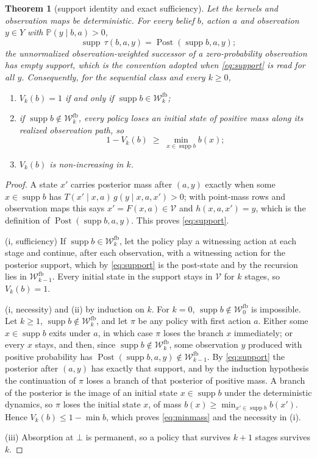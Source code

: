 \documentclass[11pt,a4paper]{article}
\theoremstyle{plain}
\newtheorem{theorem}{Theorem}[section]
\theoremstyle{definition}
\theoremstyle{remark}
\newcommand{\Prob}{\mathbb{P}}
\newcommand{\calV}{\mathcal{V}}
\newcommand{\calW}{\mathcal{W}}
\newcommand{\Wfb}{\calW^{\mathrm{fb}}}
\newcommand{\supp}{\operatorname{supp}}
\newcommand{\Post}{\operatorname{Post}}
\begin{document}
\begin{theorem}[support identity and exact sufficiency]\label{thm:support}
Let the kernels and observation maps be deterministic. For every belief $b$, action $a$ and observation $y\in Y$ with $\Prob(y\mid b,a)>0$,
\begin{equation}\label{eq:support}
\supp\,\tau(b,a,y)=\Post(\supp b,a,y);
\end{equation}
the unnormalized observation-weighted successor of a zero-probability observation has empty support, which is the convention adopted when \eqref{eq:support} is read for all $y$. Consequently, for the sequential class and every $k\ge0$,
\begin{enumerate}[leftmargin=1.6em,itemsep=1pt]
\item[(i)] $V_k(b)=1$ if and only if $\supp b\in\Wfb_k$;
\item[(ii)] if $\supp b\notin\Wfb_k$, every policy loses an initial state of positive mass along its realized observation path, so
\begin{equation}\label{eq:minmass}
1-V_k(b)\;\ge\;\min_{x\in\supp b}b(x);
\end{equation}
\item[(iii)] $V_k(b)$ is non-increasing in $k$.
\end{enumerate}
\end{theorem}

\begin{proof}
A state $x'$ carries posterior mass after $(a,y)$ exactly when some $x\in\supp b$ has $T(x'\mid x,a)\,g(y\mid x,a,x')>0$; with point-mass rows and observation maps this says $x'=F(x,a)\in\calV$ and $h(x,a,x')=y$, which is the definition of $\Post(\supp b,a,y)$. This proves \eqref{eq:support}.

(i, sufficiency) If $\supp b\in\Wfb_k$, let the policy play a witnessing action at each stage and continue, after each observation, with a witnessing action for the posterior support, which by \eqref{eq:support} is the post-state and by the recursion lies in $\Wfb_{k-1}$. Every initial state in the support stays in $\calV$ for $k$ stages, so $V_k(b)=1$.

(i, necessity) and (ii) by induction on $k$. For $k=0$, $\supp b\notin\Wfb_0$ is impossible. Let $k\ge1$, $\supp b\notin\Wfb_k$, and let $\pi$ be any policy with first action $a$. Either some $x\in\supp b$ exits under $a$, in which case $\pi$ loses the branch $x$ immediately; or every $x$ stays, and then, since $\supp b\notin\Wfb_k$, some observation $y$ produced with positive probability has $\Post(\supp b,a,y)\notin\Wfb_{k-1}$. By \eqref{eq:support} the posterior after $(a,y)$ has exactly that support, and by the induction hypothesis the continuation of $\pi$ loses a branch of that posterior of positive mass. A branch of the posterior is the image of an initial state $x\in\supp b$ under the deterministic dynamics, so $\pi$ loses the initial state $x$, of mass $b(x)\ge\min_{x'\in\supp b}b(x')$. Hence $V_k(b)\le1-\min b$, which proves \eqref{eq:minmass} and the necessity in (i).

(iii) Absorption at $\bot$ is permanent, so a policy that survives $k+1$ stages survives $k$.
\end{proof}
\end{document}
